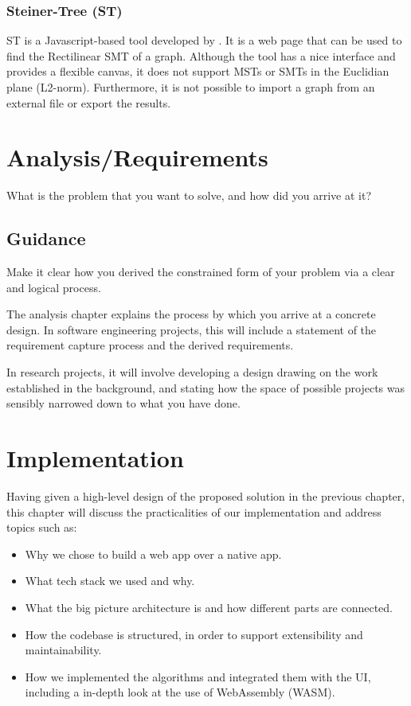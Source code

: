 \documentclass{l4proj}
\begin{document}
\subsection{Steiner-Tree (ST)}
ST is a Javascript-based tool developed by \cite{Steiner-Tree}. It is a web page that can be used to find the Rectilinear SMT of a graph. Although the tool has a nice interface and provides a flexible canvas, it does not support MSTs or SMTs in the Euclidian plane (L2-norm). Furthermore, it is not possible to import a graph from an external file or export the results.

\chapter{Analysis/Requirements}
What is the problem that you want to solve, and how did you arrive at it?
\section{Guidance}
Make it clear how you derived the constrained form of your problem via a clear and logical process.

The analysis chapter explains the process by which you arrive at a concrete design. In software
engineering projects, this will include a statement of the requirement capture process and the
derived requirements.

In research projects, it will involve developing a design drawing on
the work established in the background, and stating how the space of possible projects was
sensibly narrowed down to what you have done.

\chapter{Implementation}
Having given a high-level design of the proposed solution in the previous chapter, this chapter will discuss the practicalities of our implementation and address topics such as:
\begin{itemize}
      \item Why we chose to build a web app over a native app.
      \item What tech stack we used and why.
      \item What the big picture architecture is and how different parts are connected.
      \item How the codebase is structured, in order to support extensibility and maintainability.
      \item How we implemented the algorithms and integrated them with the UI, including a in-depth look at the use of WebAssembly (WASM).
\end{itemize}
\end{document}
